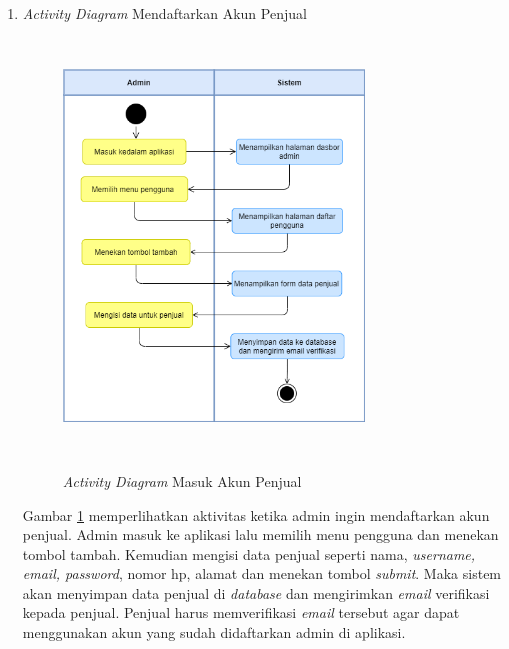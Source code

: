 \begin{enumerate}
	\item \textit{Activity Diagram} Mendaftarkan Akun Penjual
	\begin{figure}[H]
		\centering
		{\includegraphics [width = 8cm, height= 11cm]{gambar/activity diagram/daftar akun penjual}}
		\caption{\textit{Activity Diagram} Masuk Akun Penjual}
		\label{daftar akun penjual}
	\end{figure}
	\par Gambar \ref*{daftar akun penjual} memperlihatkan aktivitas ketika admin ingin mendaftarkan akun penjual.
	Admin masuk ke aplikasi lalu memilih menu pengguna dan menekan tombol tambah. Kemudian mengisi data penjual seperti nama, \textit{username, email, password}, nomor hp, alamat dan menekan tombol \textit{submit}. Maka sistem akan menyimpan data penjual di \textit{database} dan mengirimkan \textit{email} verifikasi kepada penjual. Penjual harus memverifikasi \textit{email} tersebut agar dapat menggunakan akun yang sudah didaftarkan admin di aplikasi.


\end{enumerate}

